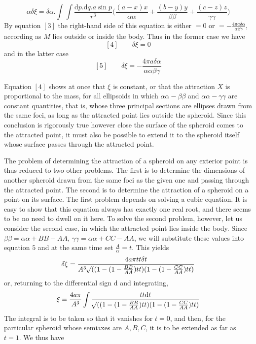 \[
\alpha\delta\xi=\delta\alpha.\int\!\int\frac{\mathrm{d}p.\mathrm{d}q.a\sin p}{r^3}\bigl(\frac{(a-x)x}{\alpha\alpha}+\frac{(b-y)y}{\beta\beta}+\frac{(c-z)z}{\gamma\gamma}\bigr)
\]
By equation $[3]$ the right-hand side of this equation is either $=0$ or $=-\frac{4\pi a\delta\alpha}{\alpha\beta\gamma}$, according as $M$ lies outside or inside the body. Thus in the former case we have
\[
[4]\qquad\delta\xi=0
\]
and in the latter case
\[
[5]\qquad\delta\xi=-\frac{4\pi a\delta\alpha}{\alpha\alpha\beta\gamma}
\]
\par
Equation $[4]$ shows at once that $\xi$ is constant, or that the attraction $X$ is proportional to the mass, for all ellipsoids in which $\alpha\alpha-\beta\beta$ and $\alpha\alpha-\gamma\gamma$ are constant quantities, that is, whose three principal sections are ellipses drawn from the same foci, as long as the attracted point lies outside the spheroid. Since this conclusion is rigorously true however close the surface of the spheroid comes to the attracted point, it must also be possible to extend it to the spheroid itself whose surface passes through the attracted point.

The problem of determining the attraction of a spheroid on any exterior point is thus reduced to two other problems. The first is to determine the dimensions of another spheroid drawn from the same foci as the given one and passing through the attracted point. The second is to determine the attraction of a spheroid on a point on its surface. The first problem depends on solving a cubic equation. It is easy to show that this equation always has exactly one real root, and there seems to be no need to dwell on it here. To solve the second problem, however, let us consider the second case, in which the attracted point lies inside the body. Since $\beta\beta=\alpha\alpha+BB-AA$, $\gamma\gamma=\alpha\alpha+CC-AA$, we will substitute these values into equation $5$ and at the same time set $\frac{A}{\alpha}=t$. This yields
\[
\delta\xi=\frac{4a\pi tt\delta t}{A^3\mathord{{}^{}\!\surd}((1-(1-\frac{BB}{AA})tt)(1-(1-\frac{CC}{AA})tt)}
\]
or, returning to the differential sign $\mathrm{d}$ and integrating,
\[
\xi=\frac{4a\pi}{A^3}\int\frac{tt\mathrm{d}t}{\mathord{{}^{}\!\surd}((1-(1-\frac{BB}{AA})tt)(1-(1-\frac{CC}{AA})tt)}
\]
The integral is to be taken so that it vanishes for $t=0$, and then, for the particular spheroid whose semiaxes are $A,B,C$, it is to be extended as far as $t=1$. We thus have
